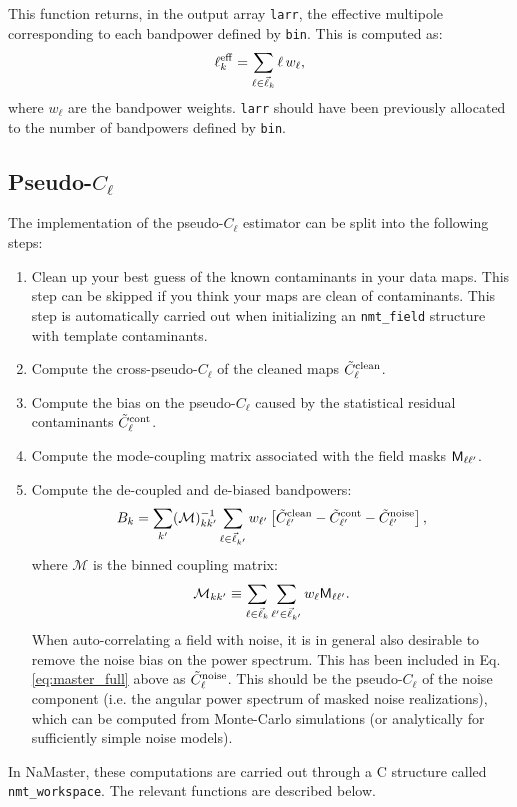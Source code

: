 \documentclass[a4paper,10pt]{article}
\newcommand{\vari}[2]{\textcolor{OliveGreen}{#1}{#2}}
\newcommand{\functi}[3]{{\tt\textcolor{OliveGreen}{#1}
    \textcolor{blue}{#2}(#3)}}
\newenvironment{funcdef}[2][void main(void)]
{\vspace{12pt}\par\noindent{\large{\bf #1}}\vspace{5pt}
 \par\noindent\leftskip=20pt{{#2}}\vspace{5pt}
 \par\noindent\leftskip=5pt\rightskip=5pt}
{\par\leftskip=0pt\rightskip=0pt\vspace{12pt}}
\begin{document}
\begin{funcdef}[nmt\_ell\_eff]
 {\functi{void}{nmt\_ell\_eff}{\vari{nmt\_binning\_scheme *}{bin},\vari{double *}{larr}}}
 This function returns, in the output array {\tt larr}, the effective multipole corresponding to each bandpower defined by {\tt bin}. This is computed as:
 \begin{equation}
   \ell^{\rm eff}_k=\sum_{\ell\in\vec{\ell}_k}\ell\,w_\ell,
 \end{equation}
 where $w_\ell$ are the bandpower weights. {\tt larr} should have been previously allocated to the number of bandpowers defined by {\tt bin}.
\end{funcdef}

\subsection{Pseudo-$C_\ell$}
The implementation of the pseudo-$C_\ell$ estimator can be split into the following steps:
\begin{enumerate}
  \item Clean up your best guess of the known contaminants in your data maps. This step can be skipped if you think your maps are clean of contaminants. This step is automatically carried out when initializing an {\tt nmt\_field} structure with template contaminants.
  \item Compute the cross-pseudo-$C_\ell$ of the cleaned maps $\tilde{C}^{\rm clean}_\ell$.
  \item Compute the bias on the pseudo-$C_\ell$ caused by the statistical residual contaminants $\tilde{C}^{\rm cont}_\ell$.
  \item Compute the mode-coupling matrix associated with the field masks ${\sf M}_{\ell\ell'}$.
  \item Compute the de-coupled and de-biased bandpowers:
        \begin{equation}\label{eq:master_full}
          B_k=\sum_{k'}(\mathcal{M})^{-1}_{kk'}\sum_{\ell\in\vec{\ell}_{k'}}w_{\ell'}\left[\tilde{C}^{\rm clean}_{\ell'}-\tilde{C}^{\rm cont}_{\ell'}-\tilde{C}^{\rm noise}_{\ell'}\right],
        \end{equation}
        where $\mathcal{M}$ is the binned coupling matrix:
        \begin{equation}
          \mathcal{M}_{kk'}\equiv\sum_{\ell\in\vec{\ell}_k}\sum_{\ell'\in\vec{\ell}_{k'}}w_\ell{\sf M}_{\ell\ell'}.
        \end{equation}
        When auto-correlating a field with noise, it is in general also desirable to remove the noise bias on the power spectrum. This has been included in Eq. \ref{eq:master_full} above as $\tilde{C}^{\rm noise}_\ell$. This should be the pseudo-$C_\ell$ of the noise component (i.e. the angular power spectrum of masked noise realizations), which can be computed from Monte-Carlo simulations (or analytically for sufficiently simple noise models).
\end{enumerate}
In NaMaster, these computations are carried out through a C structure called {\tt nmt\_workspace}. The relevant functions are described below.
\end{document}
